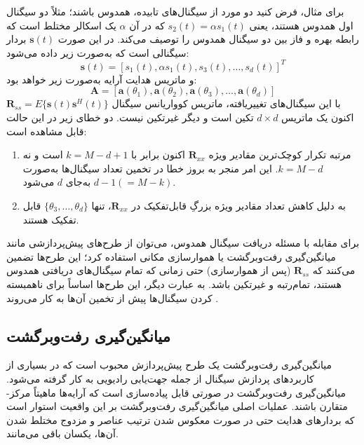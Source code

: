 برای مثال، فرض کنید دو مورد از سیگنال‌های تابیده، همدوس باشند؛ مثلاً دو سیگنال اول همدوس هستند، یعنی $s_2(t) = \alpha s_1(t)$ که در آن $\alpha$ یک اسکالر مختلط است که رابطه بهره و فاز بین دو سیگنال همدوس را توصیف می‌کند. در این صورت $\bm{s}(t)$ بردار سیگنالی است که به‌صورت زیر داده می‌شود:
\begin{equation}
	\bm{s}(t) = [s_1(t), \alpha s_1(t), s_3(t), \dots, s_d(t)]^T
	\label{eq:4-2}
\end{equation}
و ماتریس هدایت آرایه به‌صورت زیر خواهد بود:
\begin{equation}
	\bm{A} = [\bm{a}(\theta_1), \bm{a}(\theta_2), \bm{a}(\theta_3), \dots, \bm{a}(\theta_d)]
	\label{eq:4-3}
\end{equation}
با این سیگنال‌های تغییریافته، ماتریس کوواریانس سیگنال $\bm{R}_{ss} = E\{\bm{s}(t)\bm{s}^H(t)\}$ اکنون یک ماتریس $d \times d$ تکین است و دیگر غیرتکین نیست. دو خطای زیر در این حالت قابل مشاهده است:
\begin{enumerate}
	\item مرتبه تکرار کوچک‌ترین مقادیر ویژه $\bm{R}_{xx}$ اکنون برابر با $k = M - d + 1$ است و نه $k = M - d$. این امر منجر به بروز خطا در تخمین تعداد سیگنال‌ها به‌صورت $d - 1 (= M - k)$ به‌جای $d$ می‌شود.
	\item به دلیل کاهش تعداد مقادیر ویژه بزرگِ قابل‌تفکیک در $\bm{R}_{xx}$، تنها $\{\theta_3, \dots, \theta_d\}$ قابل تفکیک هستند.
\end{enumerate}
برای مقابله با مسئله دریافت سیگنال همدوس، می‌توان از طرح‌های پیش‌پردازشی مانند میانگین‌گیری رفت‌وبرگشت یا هموارسازی مکانی استفاده کرد؛ این طرح‌ها تضمین می‌کنند که $\bm{R}_{ss}$ (پس از هموارسازی) حتی زمانی که تمام سیگنال‌های دریافتی همدوس هستند، تمام‌رتبه و غیرتکین باشد. به عبارت دیگر، این طرح‌ها اساساً برای ناهمبسته کردن سیگنال‌ها پیش از تخمین  آن‌ها به کار می‌روند \cite{4-1, 4-2}.

\subsection{میانگین‌گیری رفت‌وبرگشت}
\label{subsec:4-2-1}
میانگین‌گیری رفت‌وبرگشت یک طرح پیش‌پردازش محبوب است که در بسیاری از کاربردهای پردازش سیگنال از جمله جهت‌یابی رادیویی به کار گرفته می‌شود. میانگین‌گیری رفت‌وبرگشت در صورتی قابل پیاده‌سازی است که آرایه‌ها ماهیتاً مرکز-متقارن باشند. عملیات اصلی میانگین‌گیری رفت‌وبرگشت بر این واقعیت استوار است که بردارهای هدایت  حتی در صورت معکوس شدن ترتیب عناصر و مزدوج مختلط شدن آن‌ها، یکسان باقی می‌مانند.

